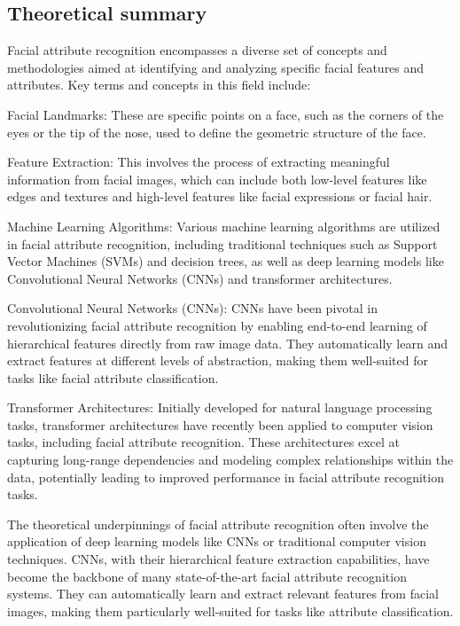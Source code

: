 \documentclass[a4paper,oneside]{article}
\begin{document}
\subsection{Theoretical summary}
\label{sec:theoretical_summary}

Facial attribute recognition encompasses a diverse set of concepts and methodologies aimed at identifying and analyzing specific facial features and attributes. Key terms and concepts in this field include:

Facial Landmarks: These are specific points on a face, such as the corners of the eyes or the tip of the nose, used to define the geometric structure of the face.

Feature Extraction: This involves the process of extracting meaningful information from facial images, which can include both low-level features like edges and textures and high-level features like facial expressions or facial hair.

Machine Learning Algorithms: Various machine learning algorithms are utilized in facial attribute recognition, including traditional techniques such as Support Vector Machines (SVMs) and decision trees, as well as deep learning models like Convolutional Neural Networks (CNNs) and transformer architectures.

Convolutional Neural Networks (CNNs): CNNs have been pivotal in revolutionizing facial attribute recognition by enabling end-to-end learning of hierarchical features directly from raw image data. They automatically learn and extract features at different levels of abstraction, making them well-suited for tasks like facial attribute classification.

Transformer Architectures: Initially developed for natural language processing tasks, transformer architectures have recently been applied to computer vision tasks, including facial attribute recognition. These architectures excel at capturing long-range dependencies and modeling complex relationships within the data, potentially leading to improved performance in facial attribute recognition tasks.

The theoretical underpinnings of facial attribute recognition often involve the application of deep learning models like CNNs or traditional computer vision techniques. CNNs, with their hierarchical feature extraction capabilities, have become the backbone of many state-of-the-art facial attribute recognition systems. They can automatically learn and extract relevant features from facial images, making them particularly well-suited for tasks like attribute classification.
\end{document}
